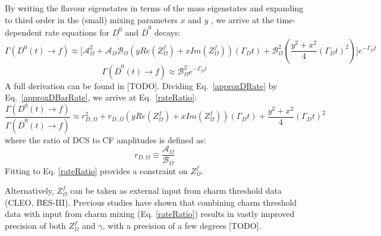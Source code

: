 \documentclass[note.tex]{subfiles}
\begin{document}
By writing the flavour eigenstates in terms of the mass eigenstates and expanding to third order in the (small) mixing parameters $x$ and $y$
, we arrive at the time-dependent rate equations for $D^0$ and $\overline{D}^0$ decays:
\begin{equation}
    \label{approxDRate}
    \Gamma(D^0(t) \rightarrow f) \approx \Biggl[ \mathcal{A}_\Omega^2
        + \mathcal{A}_\Omega \mathcal{B}_\Omega \left( yRe(Z_\Omega^f) + xIm(Z_\Omega^f)\right)(\Gamma_Dt)
        + \mathcal{B}_\Omega^2 \left( \frac{y^2 + x^2}{4} (\Gamma_Dt)^2 \right)
        \Biggr] e^{-\Gamma_Dt}
\end{equation}
\begin{equation}
    \label{approxDBarRate}
    \Gamma(\overline{D}^0(t) \rightarrow f) \approx \mathcal{B}_\Omega^2 e^{-\Gamma_Dt}
\end{equation}
A full derivation can be found in [TODO].
Dividing Eq.~\ref{approxDRate} by Eq.~\ref{approxDBarRate}, we arrive at Eq.~\ref{rateRatio}:
\begin{equation}
    \label{rateRatio}
    \frac{\Gamma(D^0(t) \rightarrow f)}{\Gamma (\overline{D}^0(t) \rightarrow f)}
    \approx  r_{D,\Omega}^2
    + r_{D,\Omega} \left( yRe(Z_\Omega^f) + xIm(Z_\Omega^f)\right)(\Gamma_Dt)
    + \frac{y^2 + x^2}{4} (\Gamma_Dt)^2
\end{equation}
where the ratio of DCS to CF amplitudes is defined as:
\begin{equation}
    \label{amplitudeRatio}
    r_{D,\Omega} \equiv \frac{\mathcal{A}_\Omega}{\mathcal{B}_\Omega}
\end{equation}
Fitting to Eq. \ref{rateRatio} provides a constraint on $Z_\Omega^f$.

Alternatively, $Z_\Omega^f$ can be taken as external input from charm threshold data (CLEO, BES-III).
Previous studies have shown that combining charm threshold data with input from charm mixing (Eq. \ref{rateRatio}) results in vastly improved precision of both $Z_\Omega^f$ and $\gamma$, with a precision of a few degrees [TODO].
\end{document}
